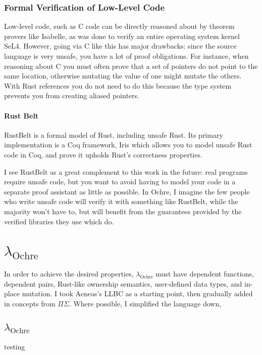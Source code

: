 \documentclass[12pt,twoside]{report}
\newcommand{\lochre}{$\lambda_\text{Ochre}$}
\begin{document}
\subsection{Formal Verification of Low-Level Code}
Low-level code, such as C code can be directly reasoned about by theorem provers like Isabelle, as was done to verify an entire operating system kernel SeL4\cite{klein_sel4_2009}. However, going via C like this has major drawbacks: since the source language is very unsafe, you have a lot of proof obligations. For instance, when reasoning about C you must often prove that a set of pointers do not point to the same location, otherwise mutating the value of one might mutate the others. With Rust references you do not need to do this because the type system prevents you from creating aliased pointers.

\subsubsection{Rust Belt}
RustBelt\cite{jung_rustbelt_2018} is a formal model of Rust, including unsafe Rust. Its primary implementation is a Coq framework, Iris\cite{noauthor_iris_nodate} which allows you to model unsafe Rust code in Coq, and prove it upholds Rust's correctness properties.

I see RustBelt as a great complement to this work in the future: real programs require unsafe code, but you want to avoid having to model your code in a separate proof assistant as little as possible. In Ochre, I imagine the few people who write unsafe code will verify it with something like RustBelt, while the majority won't have to, but will benefit from the guarantees provided by the verified libraries they use which do.

\chapter{\lochre{}}
In order to achieve the desired properties, \lochre{} must have dependent functions, dependent pairs, Rust-like ownership semantics, user-defined data types, and in-place mutation. I took Aeneas's LLBC as a starting point, then gradually added in concepts from $\Pi\Sigma$\cite{altenkirch2010pisigma}. Where possible, I simplified the language down, 

\section{\lochre}
testing
\end{document}
